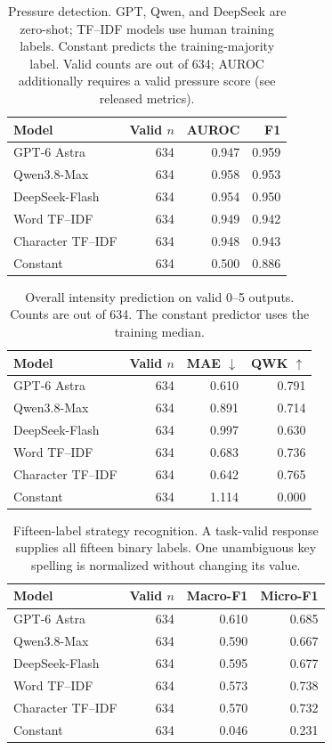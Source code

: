 \begin{table}[t]
\centering\small
\setlength{\tabcolsep}{3pt}
\begin{tabular}{@{}lrrr@{}}
\toprule
Model & Valid $n$ & AUROC & F1\\
\midrule
GPT-6 Astra & 634 & 0.947 & 0.959\\
Qwen3.8-Max & 634 & 0.958 & 0.953\\
DeepSeek-Flash & 634 & 0.954 & 0.950\\
Word TF--IDF & 634 & 0.949 & 0.942\\
Character TF--IDF & 634 & 0.948 & 0.943\\
Constant & 634 & 0.500 & 0.886\\
\bottomrule
\end{tabular}
\caption{Pressure detection. GPT, Qwen, and DeepSeek are zero-shot; TF--IDF models use human training labels. Constant predicts the training-majority label. Valid counts are out of 634; AUROC additionally requires a valid pressure score (see released metrics).}
\label{tab:pressure_results}
\end{table}

\begin{table}[t]
\centering\small
\setlength{\tabcolsep}{3pt}
\begin{tabular}{@{}lrrr@{}}
\toprule
Model & Valid $n$ & MAE $\downarrow$ & QWK $\uparrow$\\
\midrule
GPT-6 Astra & 634 & 0.610 & 0.791\\
Qwen3.8-Max & 634 & 0.891 & 0.714\\
DeepSeek-Flash & 634 & 0.997 & 0.630\\
Word TF--IDF & 634 & 0.683 & 0.736\\
Character TF--IDF & 634 & 0.642 & 0.765\\
Constant & 634 & 1.114 & 0.000\\
\bottomrule
\end{tabular}
\caption{Overall intensity prediction on valid 0--5 outputs. Counts are out of 634. The constant predictor uses the training median.}
\label{tab:intensity_results}
\end{table}

\begin{table}[t]
\centering\small
\setlength{\tabcolsep}{3pt}
\begin{tabular}{@{}lrrr@{}}
\toprule
Model & Valid $n$ & Macro-F1 & Micro-F1\\
\midrule
GPT-6 Astra & 634 & 0.610 & 0.685\\
Qwen3.8-Max & 634 & 0.590 & 0.667\\
DeepSeek-Flash & 634 & 0.595 & 0.677\\
Word TF--IDF & 634 & 0.573 & 0.738\\
Character TF--IDF & 634 & 0.570 & 0.732\\
Constant & 634 & 0.046 & 0.231\\
\bottomrule
\end{tabular}
\caption{Fifteen-label strategy recognition. A task-valid response supplies all fifteen binary labels. One unambiguous key spelling is normalized without changing its value.}
\label{tab:strategy_results}
\end{table}

